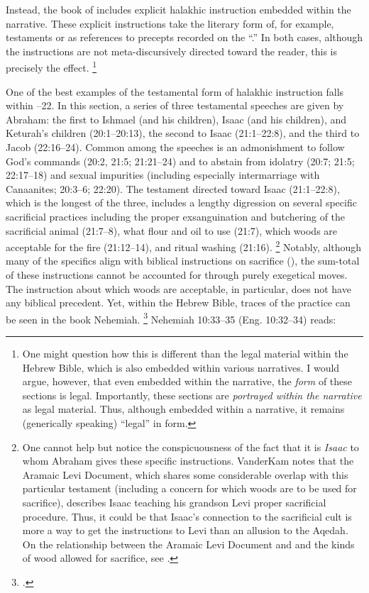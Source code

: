 Instead, the book of \jub includes explicit halakhic instruction embedded within the narrative. These explicit instructions take the literary form of, for example, testaments or as references to precepts recorded on the ``\heavenlytablets.'' In both cases, although the instructions are not meta-discursively directed toward the reader, this is precisely the effect.%
    \footnote{One might question how this is different than the legal material within the Hebrew Bible, which is also embedded within various narratives. I would argue, however, that even embedded within the narrative, the \emph{form} of these sections is legal. Importantly, these sections are \emph{portrayed within the narrative} as legal material. Thus, although embedded within a narrative, it remains (generically speaking) ``legal'' in form.}

One of the best examples of the testamental form of halakhic instruction falls within --22. In this section, a series of three testamental speeches are given by Abraham: the first to Ishmael (and his children), Isaac (and his children), and Keturah's children (20:1--20:13), the second to Isaac (21:1--22:8), and the third to Jacob (22:16--24). Common among the speeches is an admonishment to follow God's commands (20:2, 21:5; 21:21--24) and to abstain from idolatry (20:7; 21:5; 22:17--18) and sexual impurities (including especially intermarriage with Canaanites; 20:3--6; 22:20). The testament directed toward Isaac (21:1--22:8), which is the longest of the three, includes a lengthy digression on several specific sacrificial practices including the proper exsanguination and butchering of the sacrificial animal (21:7--8), what flour and oil to use (21:7), which woods are acceptable for the fire (21:12--14), and ritual washing (21:16).%
    \footnote{One cannot help but notice the conspicuousness of the fact that it is \emph{Isaac} to whom Abraham gives these specific instructions. VanderKam notes that the Aramaic Levi Document, which shares some considerable overlap with this particular testament (including a concern for which woods are to be used for sacrifice), describes Isaac teaching his grandson Levi proper sacrificial procedure. Thus, it could be that Isaac's connection to the sacrificial cult is more a way to get the instructions to Levi than an allusion to the Aqedah. On the relationship between the Aramaic Levi Document and \jub and the kinds of wood allowed for sacrifice, see \cite[625, 636--639]{vanderkam2018}.}
Notably, although many of the specifics align with biblical instructions on sacrifice (), the sum-total of these instructions cannot be accounted for through purely exegetical moves. The instruction about which woods are acceptable, in particular, does not have any biblical precedent. Yet, within the Hebrew Bible, traces of the practice can be seen in the book Nehemiah.%
    \footnote{\cite[]{vanderkam2018}.}
Nehemiah 10:33--35 (Eng. 10:32--34) reads:

